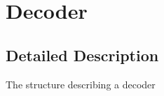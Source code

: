 \hypertarget{group__decoder}{}\section{Decoder}
\label{group__decoder}


\subsection{Detailed Description}
The structure describing a decoder 